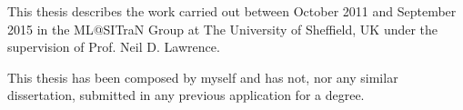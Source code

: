 
\begin{declaration}
This thesis describes the work carried out between October 2011 and September 2015 in the ML@SITraN Group at The University of Sheffield, UK under the supervision of Prof. Neil D. Lawrence.

This thesis has been composed by myself and has not, nor any similar dissertation, submitted in
any previous application for a degree.
\end{declaration}

